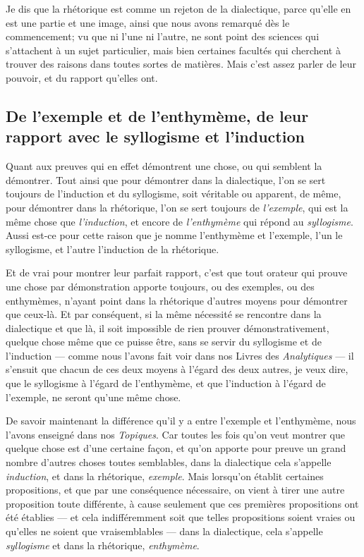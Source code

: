 Je dis que la rhétorique est comme un rejeton de la dialectique, parce qu'elle en est une partie et une image, ainsi que nous avons remarqué dès le
commencement; vu que ni l'une ni l'autre, ne sont point des sciences qui s'attachent à un sujet particulier, mais bien certaines facultés qui cherchent
à trouver des raisons dans toutes sortes de matières. Mais c'est assez parler de leur pouvoir, et du rapport qu'elles ont.

\subsection{De l'exemple et de l'enthymème, de leur rapport avec le syllogisme et l'induction}

Quant aux preuves qui en effet démontrent  une chose, ou qui semblent la démontrer. Tout ainsi que pour démontrer dans la dialectique, l'on se sert toujours
de l'induction et du syllogisme, soit véritable ou apparent, de même, pour démontrer dans la rhétorique, l'on se sert  toujours de \emph{l'exemple}, qui est
la même chose que \emph{l'induction}, et encore de \emph{l'enthymème} qui répond au \emph{syllogisme}. Aussi est-ce pour cette  raison que je nomme l'enthymème
et l'exemple, l'un le syllogisme, et l'autre l'induction de la rhétorique.

Et de vrai pour montrer leur parfait rapport, c'est que tout orateur qui prouve une chose par démonstration apporte toujours, ou des exemples, ou des
enthymèmes, n'ayant point dans la rhétorique d'autres moyens pour démontrer que ceux-là. Et par conséquent, si la même nécessité se rencontre dans la
dialectique et que là, il soit impossible de rien prouver démonstrativement, quelque chose même que ce puisse être, sans se servir du syllogisme et de
l'induction --- comme nous l'avons fait voir dans nos Livres des \emph{Analytiques} --- il s'ensuit que chacun de ces deux moyens à l'égard des deux
autres, je veux dire, que le syllogisme à l'égard de l'enthymème, et que l'induction à l'égard de l'exemple, ne seront qu'une même chose.

\medbreak

De savoir maintenant la différence qu'il y a entre l'exemple et l'enthymème, nous l'avons enseigné dans nos \emph{Topiques}. Car toutes les fois qu'on veut
montrer que quelque chose est d'une certaine façon, et qu'on apporte pour  preuve un grand nombre d'autres choses toutes semblables, dans la dialectique cela
s'appelle \emph{induction}, et dans la rhétorique, \emph{exemple}. Mais lorsqu'on établit certaines propositions, et que par une conséquence nécessaire, on
vient à tirer une autre proposition toute différente, à cause seulement que ces premières propositions ont été établies --- et cela indifféremment soit que
telles propositions soient vraies ou qu'elles ne soient que vraisemblables --- dans la dialectique, cela  s'appelle \emph{syllogisme} et dans la rhétorique,
\emph{enthymème}.

